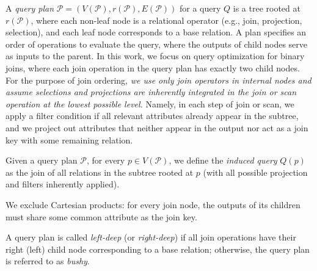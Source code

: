 A \emph{query plan} $\mathcal{P} = (V(\mathcal{P}), r(\mathcal{P}), E(\mathcal{P}))$ for a query $Q$ is a tree rooted at $r(\mathcal{P})$, where each non-leaf node is a relational operator (e.g., join, projection, selection), and each leaf node corresponds to a base relation. 
A plan specifies an order of operations to evaluate the query, where the outputs of child nodes serve as inputs to the parent.
In this work, we focus on query optimization for binary joins, where each join operation in the query plan has exactly two child nodes.  
For the purpose of join ordering, \emph{we use only join operators in internal nodes and assume selections and projections are inherently integrated in the join
or scan
operation at the lowest possible level.}
Namely, in each step of join or scan, we apply a filter condition if all relevant attributes already appear in the subtree, and we project out attributes that neither appear in the output nor act as a join key with some remaining relation.

Given a query plan $\mathcal{P}$, for every $p \in V(\mathcal{P})$, we define the \emph{induced query} $Q(p)$ as the join of all relations in the subtree rooted at $p$ (with all possible projection and filters inherently applied).

We exclude Cartesian products: for every join node, the outputs of its children must share some common attribute as the join key.

A query plan is called \emph{left-deep} (or \emph{right-deep}) if all join operations have their right (left) child node corresponding to a base relation; otherwise, the query plan is referred to as \emph{bushy}.  


